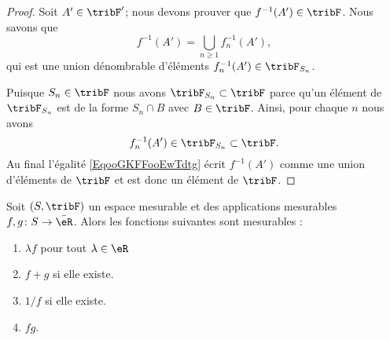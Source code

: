 \begin{proof}
	Soit \( A'\in\tribF'\); nous devons prouver que \( f^{-1}(A')\in \tribF\). Nous savons que
	\begin{equation}        \label{EqooGKFFooEwTdtg}
		f^{-1}(A')=\bigcup_{n\geq 1}f_n^{-1}(A'),
	\end{equation}
	qui est une union dénombrable d'éléments \( f_n^{-1}(A')\in\tribF_{S_n}\).

	Puisque \( S_n\in \tribF\) nous avons \( \tribF_{S_n}\subset\tribF\) parce qu'un élément de \( \tribF_{S_n}\) est de la forme \( S_n\cap B\) avec \( B\in\tribF\). Ainsi, pour chaque \( n\) nous avons
	\begin{equation}
		f_n^{-1}(A')\in\tribF_{S_n}\subset \tribF.
	\end{equation}
	Au final l'égalité \eqref{EqooGKFFooEwTdtg} écrit \( f^{-1}(A')\) comme une union d'éléments de \( \tribF\) et est donc un élément de \( \tribF\).
\end{proof}

\begin{proposition}     \label{PROPooODDVooEEmmTX}
	Soit \( (S,\tribF)\) un espace mesurable et des applications mesurables \( f,g\colon S\to \bar \eR\). Alors les fonctions suivantes sont mesurables :
	\begin{enumerate}
		\item
		      \( \lambda f\) pour tout \( \lambda\in \eR\)
		\item
		      \( f+g\) si elle existe.
		\item
		      \( 1/f\) si elle existe.
		\item
		      \( fg\).
	\end{enumerate}
\end{proposition}

